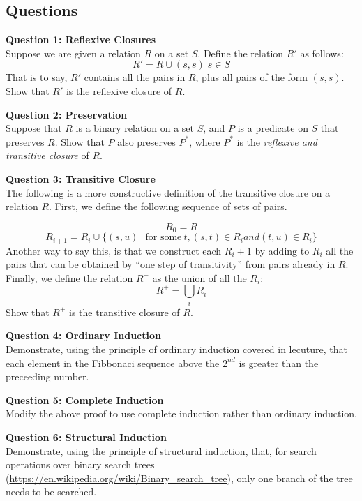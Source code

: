 \documentclass{exam}
\begin{document}
\subsection*{Questions}
\begin{questions}
\question[5] \textbf{Question 1: Reflexive Closures} \\
Suppose we are given a relation $R$ on a set $S$.  Define the relation $R'$ as follows:
$$R' = R \cup {(s,s) | s \in S}$$
That is to say, $R'$ contains all the pairs in $R$, plus all pairs of the form $(s,s)$.  Show that $R'$ is the reflexive closure of $R$.  

\question[5] \textbf{Question 2: Preservation} \\
Suppose that $R$ is a binary relation on a set $S$, and $P$ is a predicate on $S$ that preserves $R$.  Show that $P$ also preserves $P^{*}$, where $P^{*}$ is the \emph{reflexive and transitive closure} of $R$.  

\question[6] \textbf{Question 3: Transitive Closure} \\
The following is a more constructive definition of the transitive closure on a relation $R$.  First, we define the following sequence of sets of pairs.

\begin{equation}
R_0 = R 
\end{equation}
\begin{equation}
R_{i+1} = R_i \cup \{(s,u) \: | \: \text{for some} \: t, (s,t) \in R_i and (t,u) \in R_i\}
\end{equation}
Another way to say this, is that we construct each $R_i+1$ by adding to $R_i$ all the pairs that can be obtained by ``one step of transitivity'' from pairs already in $R$.  Finally, we define the relation $R^{+}$ as the union of all the $R_i$:
\begin{equation}
R^{+} = \bigcup_i R_i
\end{equation}
Show that $R^{+}$ is the transitive closure of $R$. 

\question[3] \textbf{Question 4: Ordinary Induction} \\ 
Demonstrate, using the principle of ordinary induction covered in lecuture, that each element in the Fibbonaci sequence above the $2^{nd}$ is greater than the preceeding number. 

\question[2] \textbf{Question 5: Complete Induction} \\ 
Modify the above proof to use complete induction rather than ordinary induction.

\question[3] \textbf{Question 6: Structural Induction} \\
Demonstrate, using the principle of structural induction, that, for search operations over binary search trees (\url{https://en.wikipedia.org/wiki/Binary_search_tree}), only one branch of the tree needs to be searched.  
\end{questions}
\end{document}
